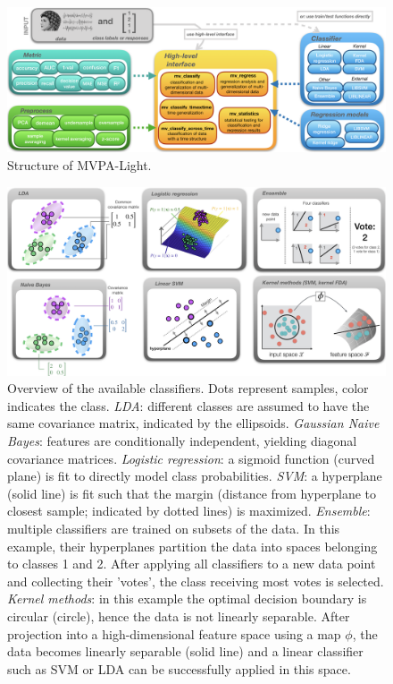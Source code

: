 \documentclass[utf8]{frontiersSCNS} %
\begin{document}
\begin{figure}[ht!]
\centering\includegraphics[width=\linewidth]{fig1_MVPA_structure}
\caption{Structure of MVPA-Light.}\label{fig:structure}
\end{figure}

\begin{figure}[ht!]
\centering\includegraphics[width=\linewidth]{overview_classifiers}
\caption{Overview of the available classifiers. Dots represent samples, color indicates the class. \textit{LDA}: different classes are assumed to have the same covariance matrix, indicated by the ellipsoids. \textit{Gaussian Naive Bayes}: features are conditionally independent, yielding diagonal covariance matrices. \textit{Logistic regression}: a sigmoid function (curved plane) is fit to directly model class probabilities. \textit{SVM}: a hyperplane (solid line) is fit such that the margin (distance from hyperplane to closest sample; indicated by dotted lines) is maximized. \textit{Ensemble}: multiple classifiers are trained on subsets of the data. In this example, their hyperplanes partition the data into spaces belonging to classes 1 and 2. After applying all classifiers to a new data point and collecting their 'votes', the class receiving most votes is selected. \textit{Kernel methods}: in this example the optimal decision boundary is circular (circle), hence the data is not linearly separable. After projection into a high-dimensional feature space using a map $\phi$, the data becomes linearly separable (solid line) and a linear classifier such as SVM or LDA can be successfully applied in this space.}\label{fig:classifiers}
\end{figure}
\end{document}
